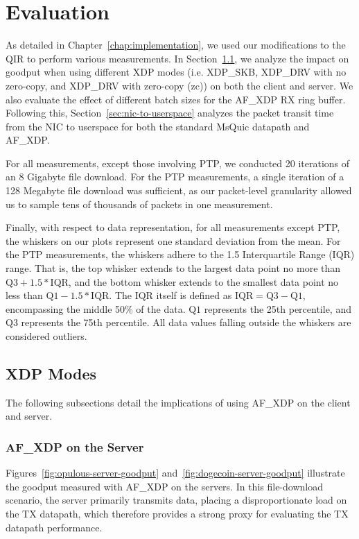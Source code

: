\chapter{Evaluation}
\label{chap:evaluation}
As detailed in Chapter~\ref{chap:implementation}, we used our modifications to the \ac{QIR} to perform various measurements. In Section~\ref{sec:xdp-modes}, we analyze the impact on goodput when using different \ac{XDP} modes (i.e. XDP\_SKB, XDP\_DRV with no zero-copy, and XDP\_DRV with zero-copy (zc)) on both the client and server. We also evaluate the effect of different batch sizes for the AF\_XDP RX ring buffer. Following this, Section~\ref{sec:nic-to-userspace} analyzes the packet transit time from the \ac{NIC} to userspace for both the standard MsQuic datapath and AF\_XDP. 

For all measurements, except those involving \ac{PTP}, we conducted 20 iterations of an 8 Gigabyte file download. For the \ac{PTP} measurements, a single iteration of a 128 Megabyte file download was sufficient, as our packet-level granularity allowed us to sample tens of thousands of packets in one measurement.

Finally, with respect to data representation, for all measurements except \ac{PTP}, the whiskers on our plots represent one standard deviation from the mean. For the \ac{PTP} measurements, the whiskers adhere to the 1.5 Interquartile Range (IQR) range. That is, the top whisker extends to the largest data point no more than $\text{Q3}+1.5*\text{IQR}$, and the bottom whisker extends to the smallest data point no less than $\text{Q1}-1.5*\text{IQR}$. The $\text{IQR}$ itself is defined as $\text{IQR}=\text{Q3}-\text{Q1}$, encompassing the middle 50\% of the data. $\text{Q1}$ represents the 25th percentile, and $\text{Q3}$ represents the 75th percentile. All data values falling outside the whiskers are considered outliers.

\section{XDP Modes}
\label{sec:xdp-modes}
The following subsections detail the implications of using AF\_XDP on the client and server.

\subsection{AF\_XDP on the Server}
\label{subsec:xdp-on-the-server}
Figures~\ref{fig:opulous-server-goodput} and~\ref{fig:dogecoin-server-goodput} illustrate the goodput measured with AF\_XDP on the servers. In this file-download scenario, the server primarily transmits data, placing a disproportionate load on the TX datapath, which therefore provides a strong proxy for evaluating the TX datapath performance.

